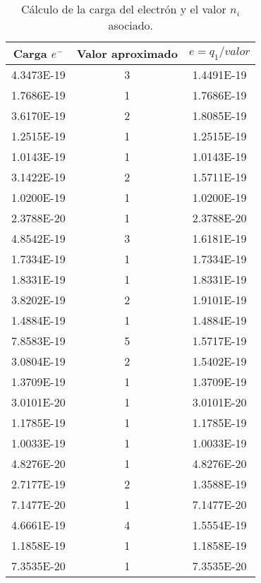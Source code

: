 \documentclass{article}
\begin{document}
\begin{enumerate}
\begin{table}[h!]
    \centering
    \begin{tabular}{|c|c|c|}
    \hline
      Carga $e^{-}$   & Valor aproximado &  $e=q_{1}/valor$\\
      \hline
       4.3473E-19  &  3 & 1.4491E-19 \\
       \hline
       1.7686E-19  &  1 & 1.7686E-19 \\
       \hline       
       3.6170E-19  &  2 & 1.8085E-19 \\
       \hline       
       1.2515E-19  &  1 & 1.2515E-19 \\
       \hline       
       1.0143E-19  &  1 & 1.0143E-19 \\
       \hline       
       3.1422E-19 &  2 & 1.5711E-19 \\
       \hline       
       1.0200E-19  &  1 & 1.0200E-19 \\
       \hline       
       2.3788E-20  &  1 & 2.3788E-20 \\
       \hline       
       4.8542E-19  &  3 & 1.6181E-19 \\
       \hline       
       1.7334E-19  &  1 & 1.7334E-19 \\
       \hline       
       1.8331E-19  &  1 & 1.8331E-19 \\
       \hline
       3.8202E-19  &  2 & 1.9101E-19 \\
       \hline       
       1.4884E-19  &  1 & 1.4884E-19 \\
       \hline       
       7.8583E-19  &  5 & 1.5717E-19\\
       \hline       
       3.0804E-19  &  2 & 1.5402E-19 \\
       \hline       
       1.3709E-19  &  1 & 1.3709E-19 \\
       \hline       
       3.0101E-20  &  1 & 3.0101E-20 \\
       \hline       
       1.1785E-19  &  1 & 1.1785E-19 \\
       \hline       
       1.0033E-19 &  1 & 1.0033E-19 \\
       \hline     
       4.8276E-20 &  1 & 4.8276E-20\\
       \hline        
       2.7177E-19 &  2 & 1.3588E-19 \\
       \hline        
       7.1477E-20 &  1 & 7.1477E-20 \\
       \hline        
       4.6661E-19 &  4 & 1.5554E-19 \\
       \hline   
       1.1858E-19 &  1 & 1.1858E-19 \\
       \hline         
       7.3535E-20 &  1 & 7.3535E-20 \\
       \hline         

    \end{tabular}
    \caption{Cálculo de la carga del electrón y el valor $n_{i}$ asociado.}
    \label{tab:my_label}
\end{table}


\end{enumerate}
\end{document}
